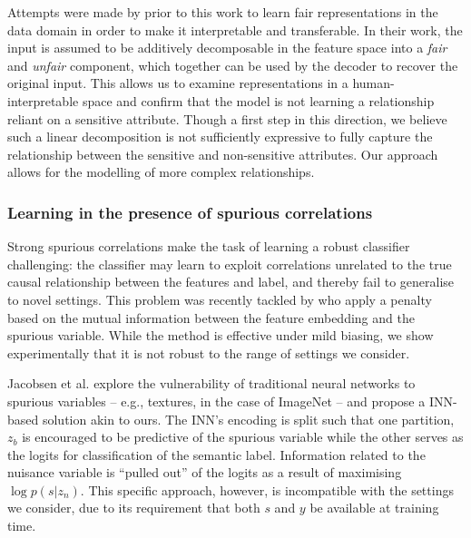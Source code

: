 Attempts were made by \cite{QuaShaTho19} prior to this work to learn fair representations in the data domain in order to make it interpretable and transferable.
In their work, the input is assumed to be additively decomposable in the feature space into a \emph{fair} and \emph{unfair} component, which together can be used by the decoder to recover the original input.
This allows us to examine representations in a human-interpretable space and confirm that the model is not learning a relationship reliant on a sensitive attribute.
Though a first step in this direction, we believe such a linear decomposition is not sufficiently expressive to fully capture the relationship between the sensitive and non-sensitive attributes.
Our approach allows for the modelling of more complex relationships.

\subsubsection{Learning in the presence of spurious correlations}
Strong spurious correlations make the task of learning a robust classifier challenging: the classifier may learn to exploit correlations unrelated to the true causal relationship between the features and label, and thereby fail to generalise to novel settings.
This problem was recently tackled by \cite{ln2l} who apply a penalty based on the mutual information between the feature embedding and the spurious variable. 
While the method is effective under mild biasing, we show experimentally that it is not robust to the range of settings we consider.

Jacobsen et al. \cite{JacBehZemBet19} explore the vulnerability of traditional neural networks to spurious variables -- e.g., textures, in the case of ImageNet \cite{Geir18} -- and propose a INN-based solution akin to ours.
The INN's encoding is split such that one partition, $z_b$ is encouraged to be predictive of the spurious variable while the other serves as the logits for classification of the semantic label. 
Information related to the nuisance variable is ``pulled out'' of the logits as a result of maximising $\log p(s|z_n)$.
This specific approach, however, is incompatible with the settings we consider, due to its requirement that both $s$ and $y$ be available at training time.

